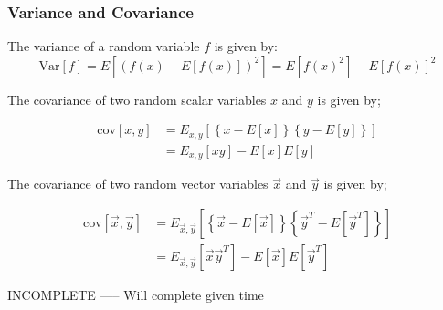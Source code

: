 \subsubsection{Variance and Covariance}
\begin{dBox}
	The variance of a random variable $f$ is given by:
	\begin{equation}
		\text{Var}[f] = E\left[ \left( f(x) - E\left[ f(x) \right] \right)^2\right] = E\left[ f(x)^2 \right] - E\left[ f(x) \right]^2
	\end{equation}
\end{dBox}

\begin{dBox}
	The covariance of two random scalar variables $x$ and $y$ is given by;

	\begin{align*}
		\text{cov}[x,y] & = E_{x,y}\left[ \left\{ x - E[x] \right\}\left\{ y-E[y] \right\} \right]\\
		& = E_{x,y}[xy] - E[x]E[y]
	\end{align*}
\end{dBox}

\begin{dBox}
	The covariance of two random vector variables $\vec{x}$ and $\vec{y}$ is given by;

	\begin{align*}
		\text{cov}[\vec{x},\vec{y}] & = E_{\vec{x},\vec{y}}\left[ \left\{ \vec{x} - E[\vec{x}] \right\}\left\{ \vec{y}^T-E[\vec{y}^T] \right\} \right]\\
		& = E_{\vec{x},\vec{y}}[\vec{x}\vec{y}^T] - E[\vec{x}]E[\vec{y}^T]
	\end{align*}
\end{dBox}

INCOMPLETE ----- Will complete given time
